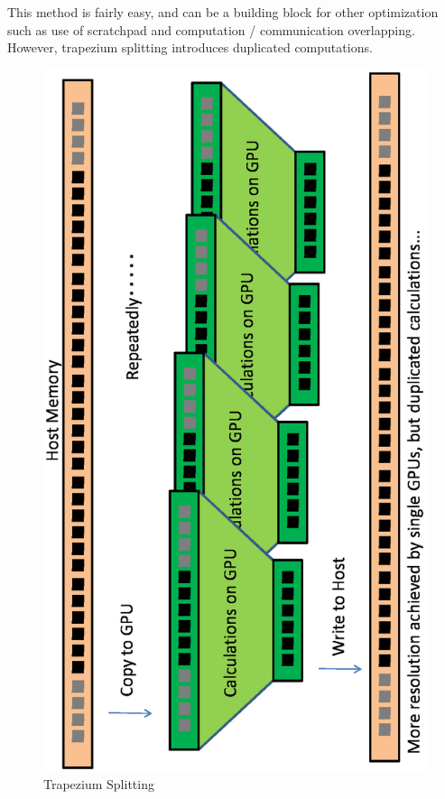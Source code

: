 \documentclass[twocolumn]{article}
\begin{document}
This method is fairly easy, and can be a building block for other optimization
such as use of scratchpad and computation / communication
overlapping. However, trapezium splitting introduces duplicated computations.


\begin{figure}
  \includegraphics[scale=0.5,angle=270]{figure/trapezium.eps}
  \caption{Trapezium Splitting}\label{FigureTrapezium}
\end{figure}
\end{document}
